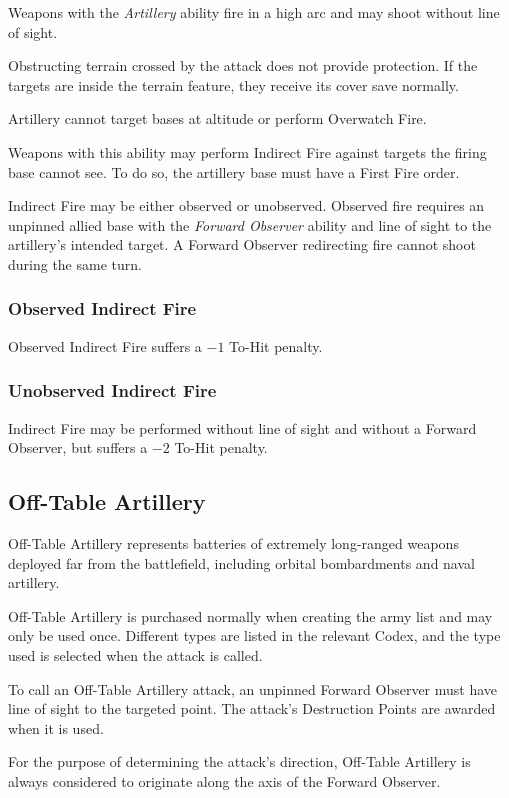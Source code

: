 Weapons with the \textit{Artillery} ability fire in a high arc and may shoot without line of sight.

Obstructing terrain crossed by the attack does not provide protection. If the targets are inside the terrain feature, they receive its cover save normally.

Artillery cannot target bases at altitude or perform Overwatch Fire.

Weapons with this ability may perform Indirect Fire against targets the firing base cannot see. To do so, the artillery base must have a First Fire order.

Indirect Fire may be either observed or unobserved. Observed fire requires an unpinned allied base with the \textit{Forward Observer} ability and line of sight to the artillery's intended target. A Forward Observer redirecting fire cannot shoot during the same turn.

\subsubsection{Observed Indirect Fire}

Observed Indirect Fire suffers a $-1$ To-Hit penalty.

\subsubsection{Unobserved Indirect Fire}

Indirect Fire may be performed without line of sight and without a Forward Observer, but suffers a $-2$ To-Hit penalty.

\subsection{Off-Table Artillery}

Off-Table Artillery represents batteries of extremely long-ranged weapons deployed far from the battlefield, including orbital bombardments and naval artillery.

Off-Table Artillery is purchased normally when creating the army list and may only be used once. Different types are listed in the relevant Codex, and the type used is selected when the attack is called.

To call an Off-Table Artillery attack, an unpinned Forward Observer must have line of sight to the targeted point. The attack's Destruction Points are awarded when it is used.

For the purpose of determining the attack's direction, Off-Table Artillery is always considered to originate along the axis of the Forward Observer.

